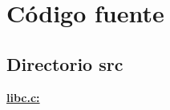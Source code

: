 \documentclass[12pt, a4paper, spanish]{report}
\begin{document}
\chapter*{C\'odigo fuente}
\clearpage
\section*{Directorio src}
\large{\underline{\textbf{libc.c:}}}\\
\lstset{style=C}

\end{document}
